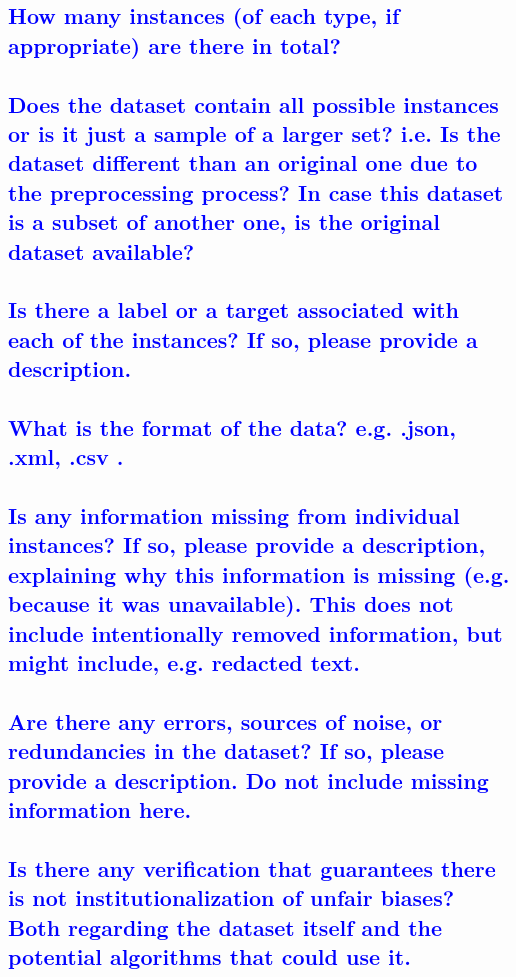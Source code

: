 \documentclass[letterpaper, 10 pt, conference]{ieeeconf}  %
\begin{document}
\textcolor{blue}{\subsection{How many instances (of each type, if appropriate) are there in total?}}
\lipsum[1]

\textcolor{blue}{\subsection{Does the dataset contain all possible instances or is it just a sample of a larger set? i.e. Is the dataset different than an original one due to the preprocessing process? In case this dataset is a subset of another one, is the original dataset available?}}
\lipsum[1]

\textcolor{blue}{\subsection{Is there a label or a target associated with each of the instances? If so, please provide a description.}}
\lipsum[1]

\textcolor{blue}{\subsection{What is the format of the data? e.g. .json, .xml, .csv .}}
\lipsum[1]

\textcolor{blue}{\subsection{Is any information missing from individual instances? If so, please provide a description, explaining why this information is missing (e.g. because it was unavailable). This does not include intentionally removed information, but might include, e.g. redacted text.}}
\lipsum[1]

\textcolor{blue}{\subsection{Are there any errors, sources of noise, or redundancies in the dataset? If so, please provide a description. Do not include missing information here.}}
\lipsum[1]

\textcolor{blue}{\subsection{Is there any verification that guarantees there is not institutionalization of unfair biases? Both regarding the dataset itself and the potential algorithms that could use it.}}
\lipsum[1]
\end{document}
